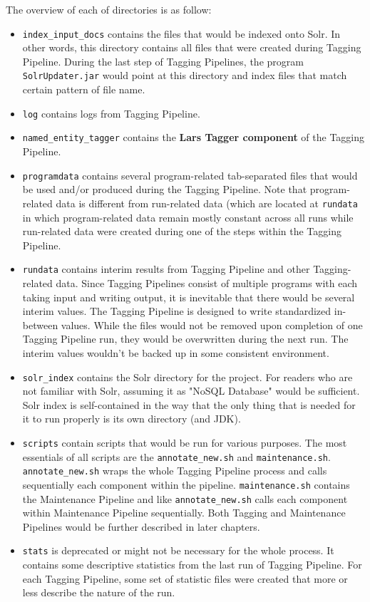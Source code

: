 The overview of each of directories is as follow:

\begin{itemize}
\item \texttt{index\_input\_docs} contains the files that would be indexed onto Solr. In other words, this directory contains all files that were created during Tagging Pipeline. During the last step of Tagging Pipelines, the program \texttt{SolrUpdater.jar} would point at this directory and index files that match certain pattern of file name.
\item \texttt{log} contains logs from Tagging Pipeline.
\item \texttt{named\_entity\_tagger} contains the \textbf{Lars Tagger component} of the Tagging Pipeline.
\item \texttt{programdata} contains several program-related tab-separated files that would be used and/or produced during the Tagging Pipeline. Note that program-related data is different from run-related data (which are located at \texttt{rundata} in which program-related data remain mostly constant across all runs while run-related data were created during one of the steps within the Tagging Pipeline. 
\item \texttt{rundata} contains interim results from Tagging Pipeline and other Tagging-related data. Since Tagging Pipelines consist of multiple programs with each taking input and writing output, it is inevitable that there would be several interim values. The Tagging Pipeline is designed to write standardized in-between values. While the files would not be removed upon completion of one Tagging Pipeline run, they would be overwritten during the next run. The interim values wouldn't be backed up in some consistent environment.
\item \texttt{solr\_index} contains the Solr directory for the project. For readers who are not familiar with Solr, assuming it as "NoSQL Database" would be sufficient. Solr index is self-contained in the way that the only thing that is needed for it to run properly is its own directory (and JDK).
\item \texttt{scripts} contain scripts that would be run for various purposes. The most essentials of all scripts are the \texttt{annotate\_new.sh} and \texttt{maintenance.sh}. \texttt{annotate\_new.sh} wraps the whole Tagging Pipeline process and calls sequentially each component within the pipeline. \texttt{maintenance.sh} contains the Maintenance Pipeline and like \texttt{annotate\_new.sh} calls each component within Maintenance Pipeline sequentially. Both Tagging and Maintenance Pipelines would be further described in later chapters.
\item \texttt{stats} is deprecated or might not be necessary for the whole process. It contains some descriptive statistics from the last run of Tagging Pipeline. For each Tagging Pipeline, some set of statistic files were created that more or less describe the nature of the run.
\end{itemize}